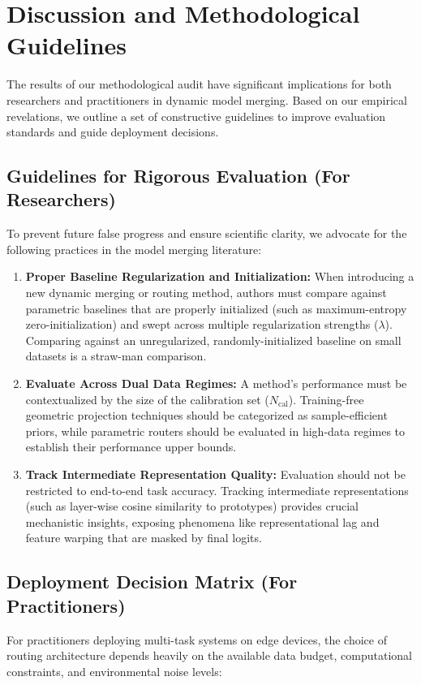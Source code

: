 \section{Discussion and Methodological Guidelines}
\label{sec:discussion}

The results of our methodological audit have significant implications for both researchers and practitioners in dynamic model merging. Based on our empirical revelations, we outline a set of constructive guidelines to improve evaluation standards and guide deployment decisions.

\subsection{Guidelines for Rigorous Evaluation (For Researchers)}
To prevent future false progress and ensure scientific clarity, we advocate for the following practices in the model merging literature:
\begin{enumerate}
    \item \textbf{Proper Baseline Regularization and Initialization:} When introducing a new dynamic merging or routing method, authors must compare against parametric baselines that are properly initialized (such as maximum-entropy zero-initialization) and swept across multiple regularization strengths ($\lambda$). Comparing against an unregularized, randomly-initialized baseline on small datasets is a straw-man comparison.
    \item \textbf{Evaluate Across Dual Data Regimes:} A method's performance must be contextualized by the size of the calibration set ($N_{\text{cal}}$). Training-free geometric projection techniques should be categorized as sample-efficient priors, while parametric routers should be evaluated in high-data regimes to establish their performance upper bounds.
    \item \textbf{Track Intermediate Representation Quality:} Evaluation should not be restricted to end-to-end task accuracy. Tracking intermediate representations (such as layer-wise cosine similarity to prototypes) provides crucial mechanistic insights, exposing phenomena like representational lag and feature warping that are masked by final logits.
\end{enumerate}

\subsection{Deployment Decision Matrix (For Practitioners)}
For practitioners deploying multi-task systems on edge devices, the choice of routing architecture depends heavily on the available data budget, computational constraints, and environmental noise levels:

